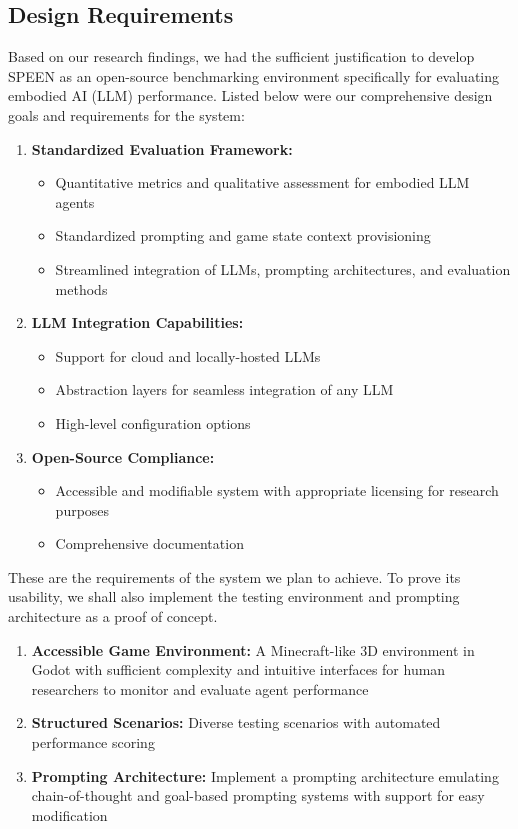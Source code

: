\documentclass{article}
\begin{document}

\subsection{Design Requirements}
Based on our research findings, we had the sufficient justification to develop SPEEN as an open-source benchmarking environment specifically for evaluating embodied AI (LLM) performance.
Listed below were our comprehensive design goals and requirements for the system:
\begin{enumerate}
    \item \textbf{Standardized Evaluation Framework:}
          \begin{itemize}
              \item Quantitative metrics and qualitative assessment for embodied LLM agents
              \item Standardized prompting and game state context provisioning
              \item Streamlined integration of LLMs, prompting architectures, and evaluation methods
          \end{itemize}
    \item \textbf{LLM Integration Capabilities:}
          \begin{itemize}
              \item Support for cloud and locally-hosted LLMs
              \item Abstraction layers for seamless integration of any LLM
              \item High-level configuration options
          \end{itemize}
    \item \textbf{Open-Source Compliance:}
          \begin{itemize}
              \item Accessible and modifiable system with appropriate licensing for research purposes
              \item Comprehensive documentation
          \end{itemize}
\end{enumerate}
These are the requirements of the system we plan to achieve.
To prove its usability, we shall also implement the testing environment and prompting architecture as a proof of concept.
\begin{enumerate}
    \item \textbf{Accessible Game Environment:} A Minecraft-like 3D environment in Godot with sufficient complexity and intuitive interfaces for human researchers to monitor and evaluate agent performance
    \item \textbf{Structured Scenarios:} Diverse testing scenarios with automated performance scoring
    \item \textbf{Prompting Architecture:} Implement a prompting architecture emulating chain-of-thought and goal-based prompting systems with support for easy modification
\end{enumerate}
\end{document}
